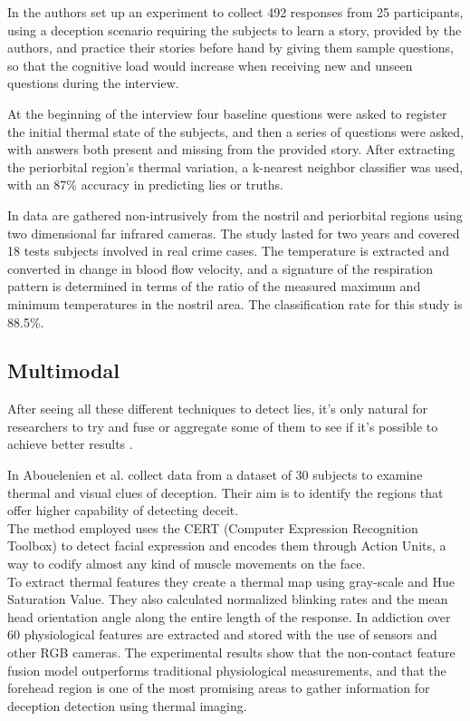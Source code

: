 In \cite{Rajoub} the authors set up an experiment to collect 492 responses from 25 participants, using a deception scenario requiring the subjects to learn a story, provided by the authors, and practice their stories before hand by giving them sample questions, so that the cognitive load would increase when receiving new and unseen questions during the interview.

At the beginning of the interview four baseline questions were asked to register the initial thermal state of the subjects, and then a series of questions were asked, with answers both present and missing from the provided story. After extracting the periorbital region's thermal variation, a k-nearest neighbor classifier was used, with an 87\% accuracy in predicting lies or truths.

In \cite{6967765} data are gathered non-intrusively from the nostril and periorbital regions using two dimensional far infrared cameras. The study lasted for two years and covered 18 tests subjects involved in real crime cases. The temperature is extracted and converted in change in blood flow velocity, and a signature of the respiration pattern is determined in terms of the ratio of the measured maximum and minimum temperatures in the nostril area. The classification rate for this study is 88.5\%.

\subsection*{Multimodal}
After seeing all these different techniques to detect lies, it's only natural for researchers to try and fuse or aggregate some of them to see if it's possible to achieve better results \cite{Abouelenien:2014:DDU:2663204.2663229}.

In \cite{Abouelenien:2016:ATV:2910674.2910682} Abouelenien et al. collect data from a dataset of 30 subjects to examine thermal and visual clues of deception. Their aim is to identify the regions that offer higher capability of detecting deceit. \\
The method employed uses the CERT (Computer Expression Recognition Toolbox) to detect facial expression and encodes them through Action Units, a way to codify almost any kind of muscle movements on the face. \\
To extract thermal features they create a thermal map using gray-scale and Hue Saturation Value. They also calculated normalized blinking rates and the mean head orientation angle along the entire length of the response. In addiction over 60 physiological features are extracted and stored with the use of sensors and other RGB cameras. The experimental results show that the non-contact feature fusion model outperforms traditional physiological measurements, and that the forehead region is one of the most promising areas to gather information for deception detection using thermal imaging.

